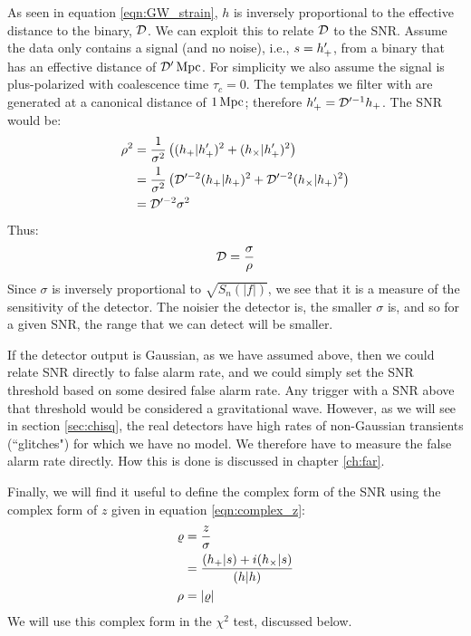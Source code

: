 As seen in equation \ref{eqn:GW_strain}, $h$ is inversely proportional to the effective distance to the binary, $\mathcal{D}$. We can exploit this to relate $\mathcal{D}$ to the \ac{SNR}. Assume the data only contains a signal (and no noise), i.e., $s = h'_{+}$, from a binary that has an effective distance of $\mathcal{D}'\,\mathrm{Mpc}$. For simplicity we also assume the signal is plus-polarized with coalescence time $\tau_c = 0$. The templates we filter with are generated at a canonical distance of $1\,\mathrm{Mpc}$; therefore $h'_{+} = \mathcal{D}'^{-1}h_{+}$. The \ac{SNR} would be:
\begin{align*}
\rho^2 &= \frac{1}{\sigma^2}\left( (h_{+}|h'_{+})^2 + (h_{\times}|h'_{+})^2 \right) \\
 &= \frac{1}{\sigma^2} \left( \mathcal{D}'^{-2}(h_{+}|h_{+})^2 + \mathcal{D}'^{-2}(h_{\times}|h_{+})^2 \right) \\
 &= \mathcal{D}'^{-2} \sigma^2
\end{align*}
Thus:
\begin{equation}
\label{eqn:DtoRho}
\effD = \frac{\sigma}{\rho}
\end{equation}
Since $\sigma$ is inversely proportional to $\sqrt{S_n(|f|)}$, we see that it is a measure of the sensitivity of the detector. The noisier the detector is, the smaller $\sigma$ is, and so for a given \ac{SNR}, the range that we can detect will be smaller.

If the detector output is Gaussian, as we have assumed above, then we could relate \ac{SNR} directly to false alarm rate, and we could simply set the \ac{SNR} threshold based on some desired false alarm rate. Any trigger with a \ac{SNR} above that threshold would be considered a gravitational wave. However, as we will see in section \ref{sec:chisq}, the real detectors have high rates of non-Gaussian transients (``glitches") for which we have no model. We therefore have to measure the false alarm rate directly. How this is done is discussed in chapter \ref{ch:far}.

Finally, we will find it useful to define the complex form of the \ac{SNR} using the complex form of $z$ given in equation \ref{eqn:complex_z}:
\begin{align}
\label{eqn:complex_rho}
\varrho &= \frac{z}{\sigma} \nonumber \\
 &= \frac{(h_\pls|s) + i(h_\crs|s)}{(h|h)} \\
\rho &= |\varrho|
\end{align}
We will use this complex form in the $\chi^2$ test, discussed below.

